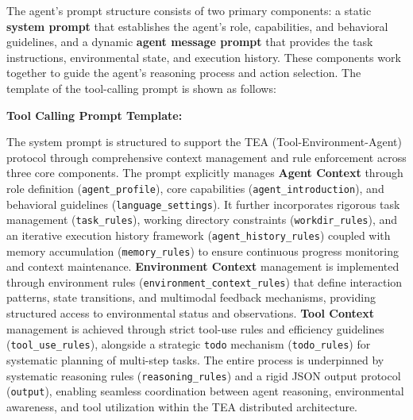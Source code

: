 \documentclass[11pt]{article}
\begin{document}
The agent's prompt structure consists of two primary components: a static \textbf{system prompt} that establishes the agent's role, capabilities, and behavioral guidelines, and a dynamic \textbf{agent message prompt} that provides the task instructions, environmental state, and execution history. These components work together to guide the agent's reasoning process and action selection. The template of the tool-calling prompt is shown as follows:

\textbf{Tool Calling Prompt Template:}

The system prompt is structured to support the TEA (Tool-Environment-Agent) protocol through comprehensive context management and rule enforcement across three core components. The prompt explicitly manages \textbf{Agent Context} through role definition (\texttt{agent\_profile}), core capabilities (\texttt{agent\_introduction}), and behavioral guidelines (\texttt{language\_settings}). It further incorporates rigorous task management (\texttt{task\_rules}), working directory constraints (\texttt{workdir\_rules}), and an iterative execution history framework (\texttt{agent\_history\_rules}) coupled with memory accumulation (\texttt{memory\_rules}) to ensure continuous progress monitoring and context maintenance. \textbf{Environment Context} management is implemented through environment rules (\texttt{environment\_context\_rules}) that define interaction patterns, state transitions, and multimodal feedback mechanisms, providing structured access to environmental status and observations. \textbf{Tool Context} management is achieved through strict tool-use rules and efficiency guidelines (\texttt{tool\_use\_rules}), alongside a strategic \texttt{todo} mechanism (\texttt{todo\_rules}) for systematic planning of multi-step tasks. The entire process is underpinned by systematic reasoning rules (\texttt{reasoning\_rules}) and a rigid JSON output protocol (\texttt{output}), enabling seamless coordination between agent reasoning, environmental awareness, and tool utilization within the TEA distributed architecture.

\end{document}
